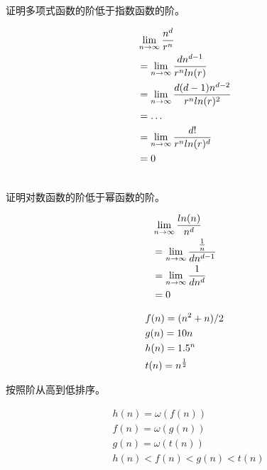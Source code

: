 证明多项式函数的阶低于指数函数的阶。

\vspace{-0.5cm}

\begin{align*}
	 & \lim\limits_{n \rightarrow \infty} {n^d \over r^n}                    \\
	 & = \lim\limits_{n \rightarrow \infty} {dn^{d-1} \over r^nln(r)}        \\
	 & = \lim\limits_{n \rightarrow \infty} {d(d-1)n^{d-2} \over r^nln(r)^2} \\
	 & = \dots                                                               \\
	 & = \lim\limits_{n \rightarrow \infty} {d! \over r^nln(r)^d}            \\
	 & = 0
\end{align*}

\vspace{0.5cm}

\\

证明对数函数的阶低于幂函数的阶。

\vspace{-0.5cm}

\begin{align*}
	 & \lim\limits_{n \rightarrow \infty} {ln(n) \over n^d}              \\
	 & = \lim\limits_{n \rightarrow \infty} {{1 \over n} \over dn^{d-1}} \\
	 & = \lim\limits_{n \rightarrow \infty} {1 \over dn^d}               \\
	 & = 0
\end{align*}

\vspace{0.5cm}


\vspace{-1cm}

\begin{align*}
	 & f(n) = (n^2 + n) / 2 \\
	 & g(n) = 10n           \\
	 & h(n) = 1.5^n         \\
	 & t(n) = n^{1 \over 2}
\end{align*}

按照阶从高到低排序。

\vspace{-1cm}

\begin{align*}
	 & h(n) = \omega(f(n))       \\
	 & f(n) = \omega(g(n))       \\
	 & g(n) = \omega(t(n))       \\
	 & h(n) < f(n) < g(n) < t(n)
\end{align*}

